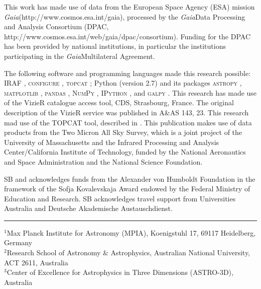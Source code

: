 \documentclass[fleqn,usenatbib,useAMS]{mnras}
\newcommand{\Gaia}{\textit{Gaia}}
\begin{document}
This work has made use of data from the European Space Agency (ESA) mission \Gaia (http://www.cosmos.esa.int/gaia), processed by the \Gaia Data Processing and Analysis Consortium (DPAC, http://www.cosmos.esa.int/web/gaia/dpac/consortium). Funding for the DPAC has been provided by national institutions, in particular the institutions participating in the \Gaia Multilateral Agreement. 

The following software and programming languages made this research possible: \textsc{IRAF} \citep{Tody1986,Tody1993}, \textsc{configure} \citep{Miszalski2006}, \textsc{topcat} \citep[version 4.4;][]{Taylor2005}; Python (version 2.7) and its packages {\textsc{astropy}} \citep[version 2.0;][]{Robitaille2013,PriceWhelan2018}, {\textsc{matplotlib}} \citep{matplotlib}, {\textsc{pandas}} \citep[version 0.20.2;][]{McKinney2011}, {\textsc{NumPy}} \citep{numpy}, {\textsc{IPython}} \citep{ipython}, and  \textsc{galpy} \citep[version 1.3;][]{Bovy2015}. This research has made use of the VizieR catalogue access tool, CDS, Strasbourg, France. The original description of the VizieR service was published in A\&AS 143, 23. This research mad use of the TOPCAT tool, described in \citet{Taylor2005}. This publication makes use of data products from the Two Micron All Sky Survey, which is a joint project of the University of Massachusetts and the Infrared Processing and Analysis Center/California Institute of Technology, funded by the National Aeronautics and Space Administration and the National Science Foundation.

SB and acknowledges funds from the Alexander von Humboldt Foundation in the framework of the Sofja Kovalevskaja Award endowed by the Federal Ministry of Education and Research. SB acknowledges travel support from Universities Australia and Deutsche Akademische Austauschdienst.







\newpage
\noindent \rule{8.5cm}{1pt}

\noindent
$^{1}$Max Planck Institute  for Astronomy (MPIA), Koenigstuhl 17, 69117 Heidelberg, Germany\\
$^{2}$Research School of Astronomy \& Astrophysics, Australian National University, ACT 2611, Australia\\
$^{3}$Center of Excellence for Astrophysics in Three Dimensions (ASTRO-3D), Australia\\
\end{document}
